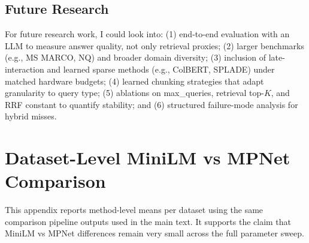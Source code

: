 \documentclass[twoside, 11pt]{article}
\begin{document}
\subsection{Future Research}
For future research work, I could look into: (1) end-to-end evaluation with an LLM to measure answer quality, not only retrieval proxies; (2) larger benchmarks (e.g., MS MARCO, NQ) and broader domain diversity; (3) inclusion of late-interaction and learned sparse methods (e.g., ColBERT, SPLADE) under matched hardware budgets; (4) learned chunking strategies that adapt granularity to query type; (5) ablations on max\_queries, retrieval top-$K$, and RRF constant to quantify stability; and (6) structured failure-mode analysis for hybrid misses.


\appendix
\section{Dataset-Level MiniLM vs MPNet Comparison}
\label{app:dataset_level}
This appendix reports method-level means per dataset using the same comparison pipeline outputs used in the main text. It supports the claim that MiniLM vs MPNet differences remain very small across the full parameter sweep.
\end{document}
